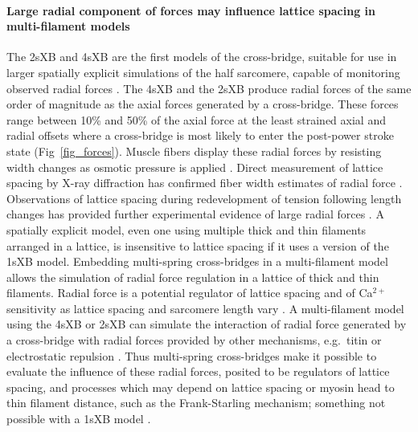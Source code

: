 \documentclass[10pt]{article}
\newcommand{\citep}[1]{\cite{#1}} %
\begin{document}
\paragraph{Large radial component of forces may influence lattice spacing in multi-filament models} %
The 2sXB and 4sXB are the first models of the cross-bridge, suitable for use in larger spatially explicit simulations of the half sarcomere, capable of monitoring observed radial forces \citep{Maughan1981, Cecchi1990, Millman1998}. 
The 4sXB and the 2sXB produce radial forces of the same order of magnitude as the axial forces generated by a cross-bridge. 
These forces range between 10\% and 50\% of the axial force at the least strained axial and radial offsets where a cross-bridge is most likely to enter the post-power stroke state (Fig~\ref{fig_forces}).
Muscle fibers display these radial forces by resisting width changes as osmotic pressure is applied \citep{Maughan1981}.
Direct measurement of lattice spacing by X-ray diffraction has confirmed fiber width estimates of radial force \citep{Matsubara1984}.
Observations of lattice spacing during redevelopment of tension following length changes has provided further experimental evidence of large radial forces \citep{Cecchi1990}. %
A spatially explicit model, even one using multiple thick and thin filaments arranged in a lattice, is insensitive to lattice spacing if it uses a version of the 1sXB model.  
Embedding multi-spring cross-bridges in a multi-filament model allows the simulation of radial force regulation in a lattice of thick and thin filaments.  
Radial force is a potential regulator of lattice spacing and of Ca$^{2+}$ sensitivity as lattice spacing and sarcomere length vary \citep{Millman1998}.  
A multi-filament model using the 4sXB or 2sXB can simulate the interaction of radial force generated by a cross-bridge with radial forces provided by other mechanisms, e.g.\ titin or electrostatic repulsion \citep{Martyn2004, Cazorla2001, Millman1998}. 
Thus multi-spring cross-bridges make it possible to evaluate the influence of these radial forces, posited to be regulators of lattice spacing, and processes which may depend on lattice spacing or myosin head to thin filament distance, such as the Frank-Starling mechanism; something not possible with a 1sXB model \citep{Smith2009}. 
\end{document}
